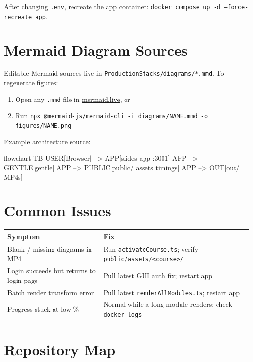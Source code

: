 \documentclass{scinexus}
\newcommand{\tableheadrow}[1]{\sffamily\bfseries\color{rbnavy} #1}
\begin{document}
After changing \texttt{.env}, recreate the app container: \texttt{docker compose up -d --force-recreate app}.

\section{Mermaid Diagram Sources}

Editable Mermaid sources live in \texttt{ProductionStacks/diagrams/*.mmd}. To regenerate figures:

\begin{enumerate}
	\item Open any \texttt{.mmd} file in \href{https://mermaid.live}{mermaid.live}, or
	\item Run \texttt{npx @mermaid-js/mermaid-cli -i diagrams/NAME.mmd -o figures/NAME.png}
\end{enumerate}

Example architecture source:

\begin{mermaidsource}
flowchart TB
  USER[Browser] --> APP[slides-app :3001]
  APP --> GENTLE[gentle]
  APP --> PUBLIC[public/ assets timings]
  APP --> OUT[out/ MP4s]
\end{mermaidsource}

\section{Common Issues}

\begin{table}[htbp]
	\centering
	\footnotesize
	\begin{tabularx}{\textwidth}{@{}L L@{}}
		\toprule
		\tableheadrow{Symptom} & \tableheadrow{Fix} \\
		\midrule
		Blank / missing diagrams in MP4 & Run \texttt{activateCourse.ts}; verify \texttt{public/assets/<course>/} \\
		Login succeeds but returns to login page & Pull latest GUI auth fix; restart app \\
		Batch render transform error & Pull latest \texttt{renderAllModules.ts}; restart app \\
		Progress stuck at low \% & Normal while a long module renders; check \texttt{docker logs} \\
		\bottomrule
	\end{tabularx}
\end{table}

\section{Repository Map}
\end{document}

